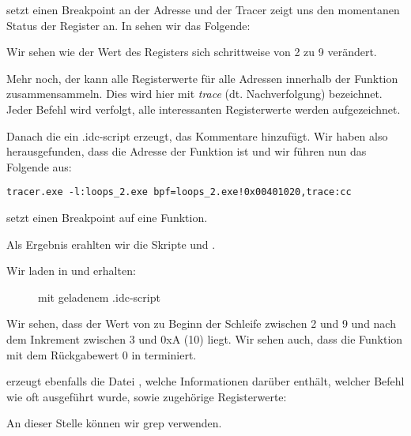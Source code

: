  setzt einen Breakpoint an der Adresse und der Tracer zeigt uns den
momentanen Status der Register an. In  sehen wir das Folgende:



Wir sehen wie der Wert des \ESI Registers sich schrittweise von 2 zu 9
verändert. 

Mehr noch, der \tracer kann alle Registerwerte für alle Adressen innerhalb der
Funktion zusammensammeln. Dies wird hier mit \emph{trace} (dt. Nachverfolgung)
bezeichnet. Jeder Befehl wird verfolgt, alle interessanten Registerwerte werden
aufgezeichnet.

Danach die ein \IDA .idc-script erzeugt, das Kommentare hinzufügt. Wir haben
also herausgefunden, dass die Adresse der \main Funktion  ist und
wir führen nun das Folgende aus:

\begin{lstlisting}
tracer.exe -l:loops_2.exe bpf=loops_2.exe!0x00401020,trace:cc
\end{lstlisting}

 setzt einen Breakpoint auf eine Funktion.

Als Ergebnis erahlten wir die Skripte  und
.

\clearpage
Wir laden  in \IDA und erhalten:

\begin{figure}[H]
\centering
{}
\caption{\IDA mit geladenem .idc-script}
\label{fig:loops_IDA_tracer}
\end{figure}

Wir sehen, dass der Wert von \ESI zu Beginn der Schleife zwischen 2 und 9 und
nach dem Inkrement zwischen 3 und 0xA (10) liegt. Wir sehen auch, dass die
Funktion \main mit dem Rückgabewert 0 in \EAX terminiert.

\tracer erzeugt ebenfalls die Datei , welche Informationen
darüber enthält, welcher Befehl wie oft ausgeführt wurde, sowie zugehörige
Registerwerte:


\myindex{\GrepUsage}
An dieser Stelle können wir grep verwenden.

